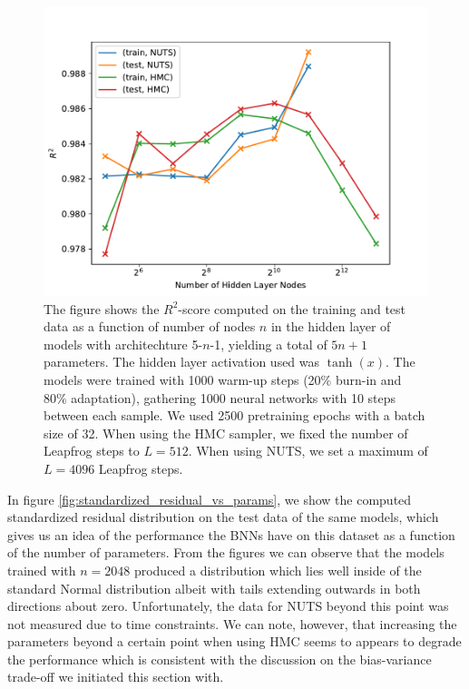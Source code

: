 \begin{figure}[h!]
    \centering
    \includegraphics[scale=0.7]{figures/r2_scores/r2_score_vs_num_params_log_space.pdf}
    \caption{
        The figure shows the $R^2$-score computed on the training and test data as a function of number of nodes $n$ in the hidden layer of models with architechture 5-$n$-1, yielding a total of $5n + 1$ parameters. The hidden layer activation used was $\tanh(x)$.
        The models were trained with 1000 warm-up steps (20\% burn-in and 80\% adaptation), gathering 1000 neural networks with 10 steps between each sample. We used 2500 pretraining epochs with a batch size of 32. 
        When using the HMC sampler, we fixed the number of Leapfrog steps to $L = 512$. When using NUTS, we set a maximum of $L = 4096$ Leapfrog steps. 
    }\label{fig:r2_scores_vs_num_params}
\end{figure}



In figure \ref{fig:standardized_residual_vs_params}, we show the computed standardized residual distribution on the test data of the same models, which gives us an idea of the performance the BNNs have on this dataset as a function of the number of parameters. From the figures we can observe that the models trained with $n = 2048$ produced a distribution which lies well inside of the standard Normal distribution albeit with tails extending outwards in both directions about zero. Unfortunately, the data for NUTS beyond this point was not measured due to time constraints. We can note, however, that increasing the parameters beyond a certain point when using HMC seems to appears to degrade the performance which is consistent with the discussion on the bias-variance trade-off we initiated this section with.

